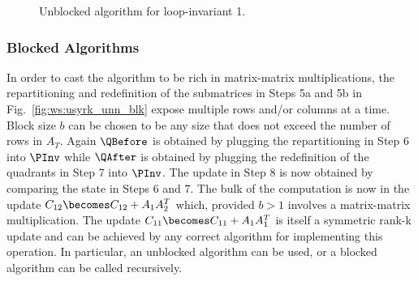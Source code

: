 \renewcommand{\repartitionings}{
$ 
\FlaTwoByTwo{ C_{TL} }{ C_{TR}}
            { \undetermined }{ C_{BR} } 
\rightarrow 
\FlaThreeByThreeTL{ C_{00} }  { c_{01} }  { C_{02} }
                  {\undetermined}{ \gamma_{11}}     { c_{12}^{T} }
                  { \undetermined }  { \undetermined }  { C_{22} }
$
and
$
\FlaTwoByOne{ A_{T} }
            { A_{B} } 
\rightarrow
\FlaThreeByOneT{ A_{0} }
               { a_{1}^T }
               { A_{2} }
$
}
\renewcommand{\repartitionsizes}{
$ a_1^T $ is a row 
and $ \gamma_{11} $ is a scalar
}

\renewcommand{\moveboundaries}{%
$ 
\FlaTwoByTwo{ C_{TL} }{ C_{TR}}
            { \undetermined }{ C_{BR} } 
\leftarrow
\FlaThreeByThreeBR{ C_{00} }  { c_{01} }  { C_{02} }
                  { \undetermined }{ \gamma_{11}}     { c_{12}^{T} }
                  { \undetermined }  { \undetermined }         { C_{22}}
$
and
$
\FlaTwoByOne{ A_{T} }
            { A_{B} } 
\leftarrow
\FlaThreeByOneB{ A_{0} }
               { a_{1}^T }
               { A_{2} }
$
}


\begin{figure}[htbp]
\FlaAlgorithm
\caption{Unblocked algorithm for loop-invariant 1.}
\label{fig:alg:usyrk_unn}
\end{figure}

\subsubsection{Blocked Algorithms}

In order to cast the algorithm to be rich in matrix-matrix
multiplications, the repartitioning and redefinition of the
submatrices in Steps 5a and 5b in Fig.~\ref{fig:ws:usyrk_unn_blk}
expose multiple rows and/or columns at a time.  Block size $ b $ can
be chosen to be any size that does not exceed the number of rows in $
A_T $.  Again $ \QBefore $ is obtained by plugging the repartitioning
in Step 6 into $ \PInv $ while $ \QAfter $ is obtained by plugging the
redefinition of the quadrants in Step 7 into $ \PInv $.  The update in
Step 8 is now obtained by comparing the state in Steps 6 and 7.  The
bulk of the computation is now in the update $ C_{12} \becomes C_{12} +  A_1
A_2^T $ which, provided $ b > 1 $ involves a matrix-matrix
multiplication.  The update $ C_{11} \becomes C_{11} +  A_1 A_1^T $ is itself a
symmetric rank-k update and can be achieved by any
correct algorithm for implementing this operation.  In particular, an
unblocked algorithm can be used, or a blocked algorithm can be called
recursively.

